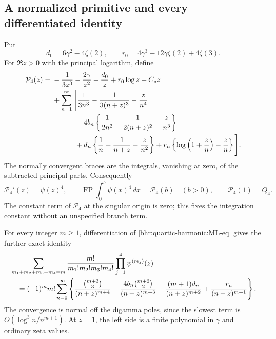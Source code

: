 \subsection{A normalized primitive and every differentiated identity}

Put
\[
 d_0=6\gamma^2-4\zeta(2),\qquad
 r_0=4\gamma^3-12\gamma\zeta(2)+4\zeta(3).
\]
For $\Re z>0$ with the principal logarithm, define
\begin{align}
 \mathcal P_4(z)={}&-\frac1{3z^3}-\frac{2\gamma}{z^2}
                      -\frac{d_0}{z}+r_0\log z+C_*z\notag\\
 &+\sum_{n=1}^{\infty}\Bigg[
   \frac1{3n^3}-\frac1{3(n+z)^3}-\frac z{n^4}\notag\\
 &\hspace{11mm}-4b_n\left\{\frac1{2n^2}-\frac1{2(n+z)^2}
                                      -\frac z{n^3}\right\}\notag\\
 &\hspace{11mm}+d_n\left\{\frac1n-\frac1{n+z}-\frac z{n^2}\right\}
       +r_n\left\{\log\left(1+\frac zn\right)-\frac zn\right\}
                                      \Bigg].
 \label{bhr:quartic-harmonic:primitive}
\end{align}
The normally convergent braces are the integrals, vanishing at zero,
of the subtracted principal parts. Consequently
\[
 \mathcal P_4'(z)=\psi(z)^4,\qquad
 \operatorname{FP}\int_0^b\psi(x)^4\,dx=\mathcal P_4(b)
      \quad(b>0),\qquad \mathcal P_4(1)=Q_4.
\]
The constant term of $\mathcal P_4$ at the singular origin is zero;
this fixes the integration constant without an unspecified branch term.

For every integer $m\ge1$, differentiation of
\eqref{bhr:quartic-harmonic:ML-eq} gives the further exact identity
\begin{align}
 &\sum_{m_1+m_2+m_3+m_4=m}
   \frac{m!}{m_1!m_2!m_3!m_4!}
      \prod_{j=1}^4\psi^{(m_j)}(z)\notag\\
 &\quad=(-1)^m m!\sum_{n=0}^{\infty}
 \left\{
  \frac{\binom{m+3}{3}}{(n+z)^{m+4}}
  -\frac{4b_n\binom{m+2}{2}}{(n+z)^{m+3}}
  +\frac{(m+1)d_n}{(n+z)^{m+2}}
  +\frac{r_n}{(n+z)^{m+1}}
 \right\}.
 \label{bhr:quartic-harmonic:derivatives}
\end{align}
The convergence is normal off the digamma poles, since the slowest
term is $O(\log^3n/n^{m+1})$. At $z=1$, the left side is a finite
polynomial in $\gamma$ and ordinary zeta values.

